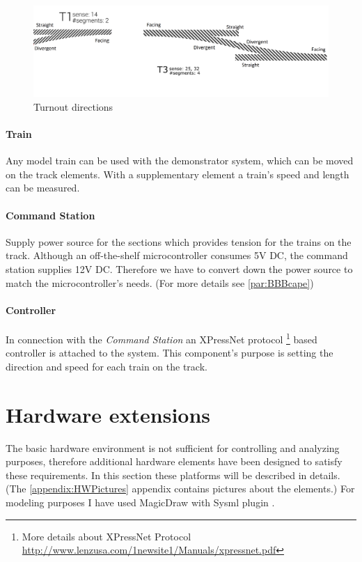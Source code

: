 \begin{figure}[ht]
	\centering
	\includegraphics[width=150mm]{figures/modes3/t1andt3.png}
	\caption{Turnout directions}
	\label{fig:turnoutDir}
\end{figure}

\paragraph{Train}
Any model train can be used with the demonstrator system, which can be moved on the track elements. With a supplementary element a train's speed and length can be measured.

\paragraph{Command Station} \label{basics:CS}
Supply power source for the sections which provides tension for the trains on the track. Although an off-the-shelf microcontroller consumes 5V DC, the command station supplies 12V DC. Therefore we have to convert down the power source to match the microcontroller's needs. (For more details see \autoref{par:BBBcape})

\paragraph{Controller}
In connection with the \textit{Command Station} an XPressNet protocol \footnote{More details about XPressNet Protocol \url{http://www.lenzusa.com/1newsite1/Manuals/xpressnet.pdf}} based controller is attached to the system. This component's purpose is setting the direction and speed for each train on the track.

\section{Hardware extensions}
The basic hardware environment is not sufficient for controlling and analyzing purposes, therefore additional hardware elements have been designed to satisfy these requirements. In this section these platforms will be described in details. (The \ref{appendix:HWPictures} appendix contains pictures about the elements.)
For modeling purposes I have used MagicDraw with Sysml plugin \cite{SysML}.

